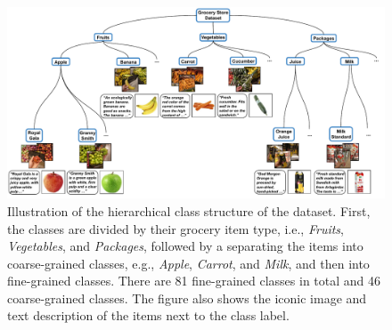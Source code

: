 
\begin{figure}[t]
    \centering
    \includegraphics[width=\textwidth]{PaperB/figures_and_tables/dataset_figures/dataset_figure_new.pdf} %
    \vspace{-3mm}
    \caption{Illustration of the hierarchical class structure of the dataset. First, the classes are divided by their grocery item type, i.e., \textit{Fruits}, \textit{Vegetables}, and \textit{Packages}, followed by a separating the items into coarse-grained classes, e.g., \textit{Apple}, \textit{Carrot}, and \textit{Milk}, and then into fine-grained classes. There are 81 fine-grained classes in total and 46 coarse-grained classes. The figure also shows the iconic image and text description of the items next to the class label.
   }
    \label{fig:examples_paperB}
    \vspace{-3mm} 
\end{figure}